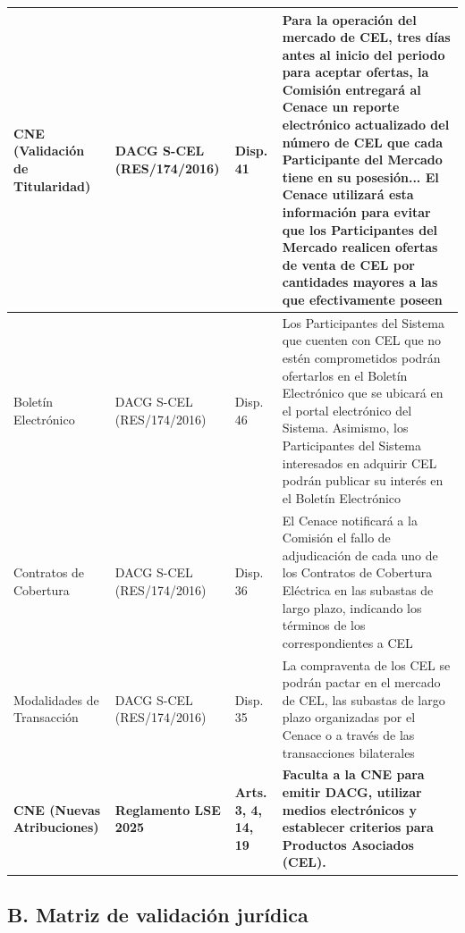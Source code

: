 \documentclass{cel}
\begin{document}
\begin{tabladoradoLargo}
\begin{xltabular}{\textwidth}{|X|X|X|X|}
CNE (Validación de Titularidad) & DACG S-CEL (RES/174/2016) & Disp. 41 & \textquotedbl{}Para la operación del mercado de CEL, tres días antes al inicio del periodo para aceptar ofertas, la Comisión entregará al Cenace un reporte electrónico actualizado del número de CEL que cada Participante del Mercado tiene en su posesión... El Cenace utilizará esta información para evitar que los Participantes del Mercado realicen ofertas de venta de CEL por cantidades mayores a las que efectivamente poseen\textquotedbl{} \\ \hline
Boletín Electrónico & DACG S-CEL (RES/174/2016) & Disp. 46 & \textquotedbl{}Los Participantes del Sistema que cuenten con CEL que no estén comprometidos podrán ofertarlos en el Boletín Electrónico que se ubicará en el portal electrónico del Sistema. Asimismo, los Participantes del Sistema interesados en adquirir CEL podrán publicar su interés en el Boletín Electrónico\textquotedbl{} \\ \hline
Contratos de Cobertura & DACG S-CEL (RES/174/2016) & Disp. 36 & \textquotedbl{}El Cenace notificará a la Comisión el fallo de adjudicación de cada uno de los Contratos de Cobertura Eléctrica en las subastas de largo plazo, indicando los términos de los correspondientes a CEL\textquotedbl{} \\ \hline
Modalidades de Transacción & DACG S-CEL (RES/174/2016) & Disp. 35 & \textquotedbl{}La compraventa de los CEL se podrán pactar en el mercado de CEL, las subastas de largo plazo organizadas por el Cenace o a través de las transacciones bilaterales\textquotedbl{} \\ \hline
\textbf{CNE (Nuevas Atribuciones)} & \textbf{Reglamento LSE 2025} & \textbf{Arts. 3, 4, 14, 19} & \textbf{Faculta a la CNE para emitir DACG, utilizar medios electrónicos y establecer criterios para Productos Asociados (CEL).} \\ \hline
\bottomrule
\end{xltabular}
\end{tabladoradoLargo}

\vspace{0.4cm}
\subsection{B. Matriz de validación jurídica}
\nopagebreak
\end{document}
